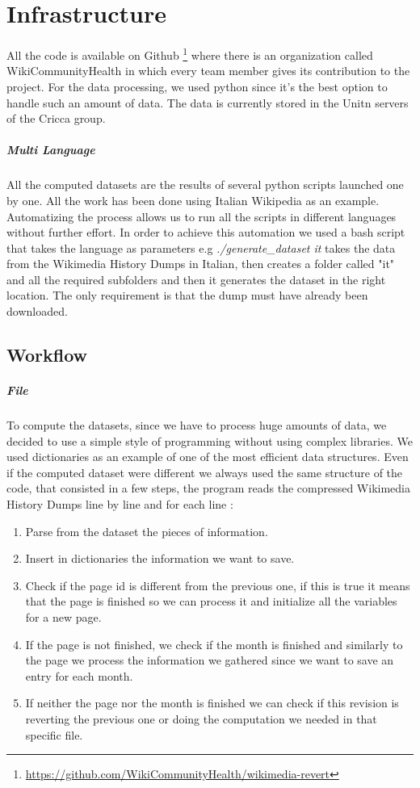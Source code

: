 \chapter{Infrastructure}

All the code is available on Github
\footnote{\url{https://github.com/WikiCommunityHealth/wikimedia-revert}} where there is an
organization called WikiCommunityHealth in which every team member gives its contribution to the
project. For the data processing, we used python since it's the best option to handle such an amount of
data. The data is currently stored in the Unitn servers of the Cricca group.
\paragraph*{Multi Language}
All the computed datasets are the results of several python scripts launched one by one. All the
work has been done using Italian Wikipedia as an example. Automatizing the process allows us to run
all the scripts in different languages without further effort. In order to achieve this automation we
used a bash script that takes the language as parameters e.g \textit{./generate\_dataset it} takes
the data from the Wikimedia History Dumps in Italian, then creates a folder called "it" and all the required subfolders
and then it generates the dataset in the right location. The only requirement is that the dump
must have already been downloaded. 


\section{Workflow}

\paragraph{File}
To compute the datasets, since we have to process huge amounts of data, we decided to use a
simple style of programming without using complex libraries. We used dictionaries as an example of
one of the most efficient data structures. Even if the computed dataset were different we always used
the same structure of the code, that consisted in a few steps, the program reads the compressed
Wikimedia History Dumps line by line and for each line :
\begin{enumerate}
    \item Parse from the dataset the pieces of information.
    \item Insert in dictionaries the information we want to save.
    \item Check if the page id is different from the previous one, if this is true it means that the
    page is finished so we can process it and initialize all the variables for a new page.
    \item If the page is not finished, we check if the month is finished and similarly to the page
    we process the information we gathered since we want to save an entry for each month.
    \item If neither the page nor the month is finished we can check if this revision is reverting the
    previous one or doing the computation we needed in that specific file.
\end{enumerate}

